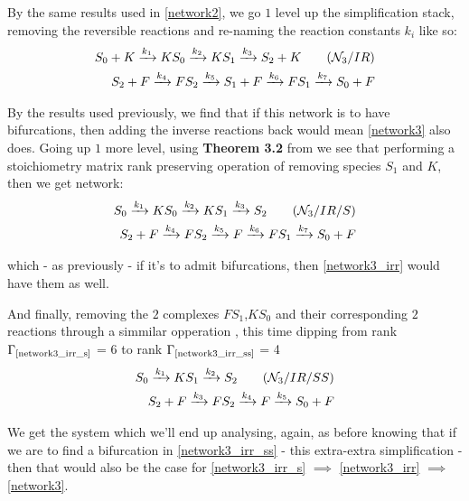 By the same results used in \ref{network2}, we go $1$ level up the simplification stack, removing the reversible reactions and re-naming the reaction constants $k_i$ like so:
\begin{align}\label{network3_irr}
	S_{0} + K \xrightarrow{k_1} KS_{0} \xrightarrow{k_2} K S_1 \xrightarrow{k_3} S_2 + K \tag{$\mathcal{N}_3 / IR $} \\
	S_{2} + F \xrightarrow{k_4} FS_{2} \xrightarrow{k_5} S_1 + F \xrightarrow{k_6} FS_1 \xrightarrow{k_{7}} S_0 + F \notag
\end{align}

By the results used previously, we find that if this network is to have bifurcations, then adding the inverse reactions back would mean \ref{network3} also does. Going up $1$ more level, using \textbf{Theorem 3.2} from \cite{banaji2017} we see that performing a stoichiometry matrix rank preserving operation of removing species $S_1$ and $K$, then we get network:
\begin{align}\label{network3_irr_s}
	S_{0} \xrightarrow{k_1} KS_{0} \xrightarrow{k_2} K S_1 \xrightarrow{k_3} S_2 \tag{$\mathcal{N}_3 / IR / S$} \\
	S_{2} + F \xrightarrow{k_4} FS_{2} \xrightarrow{k_5} F \xrightarrow{k_6} FS_1 \xrightarrow{k_{7}} S_0 + F \notag
\end{align}

which - as previously - if it's to admit bifurcations, then \ref{network3_irr} would have them as well.

And finally, removing the $2$ complexes $FS_1$,$KS_0$ and their corresponding $2$ reactions through a simmilar opperation \cite{banaji2017}, this time dipping from rank $\Gamma_{\text{\ref{network3_irr_s}}}$ = 6 to rank $\Gamma_{\text{\ref{network3_irr_ss}}}$ = 4
\begin{align}\label{network3_irr_ss}
	S_{0} \xrightarrow{k_1} KS_{1} \xrightarrow{k_2} S_2 \tag{$\mathcal{N}_3 / IR / SS$} \\
	S_{2} + F \xrightarrow{k_3} FS_{2} \xrightarrow{k_4} F \xrightarrow{k_{5}} S_0 + F \notag
\end{align}

We get the system which we'll end up analysing, again, as before knowing that if we are to find a bifurcation in \ref{network3_irr_ss} - this extra-extra simplification - then that would also be the case for \ref{network3_irr_s} $\implies$ \ref{network3_irr} $\implies$ \ref{network3}.

